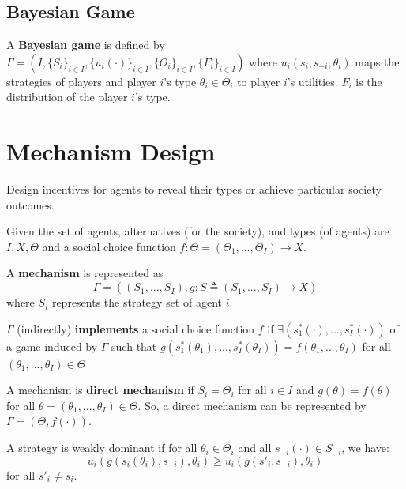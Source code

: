 \documentclass[11pt]{elegantbook}
\begin{document}
\subsection{Bayesian Game}
\begin{definition}
    \normalfont
    A \textbf{Bayesian game} is defined by $\Gamma=(I, \{S_i\}_{i\in I}, \{u_i(\cdot)\}_{i\in I},\{\Theta_i\}_{i\in I}, \{F_i\}_{i\in I})$
    where $u_i(s_i,s_{-i},\theta_i)$ maps the strategies of players and player $i$'s type $\theta_i\in \Theta_i$ to player $i$'s utilities. $F_i$ is the distribution of the player $i$'s type.
\end{definition}


\section{Mechanism Design}
Design incentives for agents to reveal their types or achieve particular society outcomes.

Given the set of agents, alternatives (for the society), and types (of agents) are $I, X, \Theta$ and a social choice function $f:\Theta=(\Theta_1,...,\Theta_I) \rightarrow X$.

\begin{definition}[Mechanism]
    \normalfont
    A \textbf{mechanism} is represented as $$\Gamma=\left((S_1,...,S_I), g:S\triangleq(S_1,...,S_I) \rightarrow X\right)$$
    where $S_i$ represents the strategy set of agent $i$.
\end{definition}

\begin{definition}[Implement]
    \normalfont
    $\Gamma$ (indirectly) \textbf{implements} a social choice function $f$ if $\exists \left(s_1^*(\cdot),...,s_I^*(\cdot)\right)$ of a game induced by $\Gamma$ such that $g(s_1^*(\theta_1),...,s_I^*(\theta_I))=f(\theta_1,...,\theta_I)$ for all $(\theta_1,...,\theta_I)\in \Theta$
\end{definition}

\begin{definition}
    \normalfont
    A mechanism is \textbf{direct mechanism} if $S_i=\Theta_i$ for all $i\in I$ and $g(\theta)=f(\theta)$ for all $\theta=(\theta_1,...,\theta_I)\in\Theta$. So, a direct mechanism can be represented by $\Gamma=(\Theta,f(\cdot))$.
\end{definition}

\begin{definition}
    \normalfont
    A strategy is weakly dominant if for all $\theta_i\in\Theta_i$ and all $s_{-i}(\cdot)\in S_{-i}$, we have:
    $$u_i(g(s_i(\theta_i),s_{-i}),\theta_i)\geq u_i(g(s'_i,s_{-i}),\theta_i)$$
    for all $s'_i\neq s_i$.
\end{definition}
\end{document}
